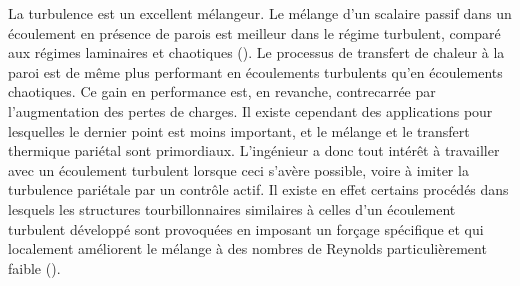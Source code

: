 La turbulence est un excellent mélangeur. Le mélange d'un scalaire passif dans un écoulement en présence de parois est meilleur dans le régime turbulent, comparé aux régimes laminaires et chaotiques (\cite{Kadoch2020}). Le processus de transfert de chaleur à la paroi est de même plus performant en écoulements turbulents qu'en écoulements chaotiques. Ce gain en performance est, en revanche, contrecarrée par l'augmentation des pertes de charges. Il existe cependant des applications pour lesquelles le dernier point est moins important, et le mélange et le transfert thermique pariétal sont primordiaux. L'ingénieur a donc tout intérêt à travailler avec un écoulement turbulent lorsque ceci s'avère possible, voire à imiter la turbulence pariétale par un contrôle actif. Il existe en effet certains procédés dans lesquels les structures tourbillonnaires similaires à celles d'un écoulement turbulent développé sont provoquées en imposant un forçage spécifique et qui localement améliorent le mélange à des nombres de Reynolds particulièrement faible (\cite{Tardu2012}).\\

